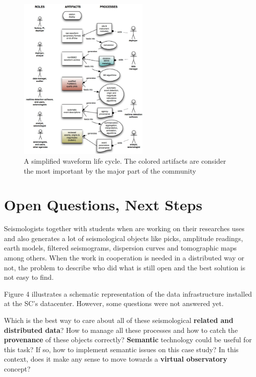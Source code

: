 \documentclass[twoside,letterpaper,twocolumn]{article}
\begin{document}
\begin{figure}[ht!]
\centering
\includegraphics[height=8cm]{images/dataSteps.png}
\caption[Figure 3]{A simplified waveform life cycle. The colored artifacts are consider the most important by the major part of the community}
\end{figure}

\section{Open Questions, Next Steps}

Seismologists together with students when are working on their researches uses and also generates a lot of seismological objects like picks, amplitude readings, earth models, filtered seismograms, dispersion curves and tomographic maps among others. When the work in cooperation is needed in a distributed way or not, the problem to describe who did what is still open and the best solution is not easy to find. 

Figure 4 illustrates a schematic representation of the data infrastructure installed at the SC's datacenter. However, some questions were not answered yet.

Which is the best way to care about all of these seismological \textbf {related and distributed data}? How to manage all these processes and how to catch the \textbf {provenance} of these objects correctly? \textbf {Semantic} technology could be useful for this task? If so, how to implement semantic issues on this case study? In this context, does it make any sense to move towards a \textbf {virtual observatory} concept?
\end{document}
